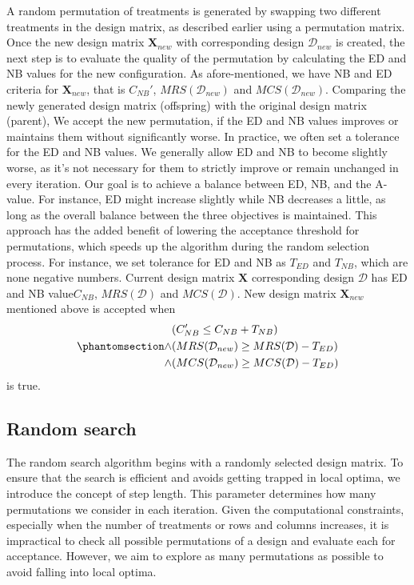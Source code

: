 \documentclass[
  a4paper,
  oneside,
  openany,
  12pt,
  onecolumn]{book}
\theoremstyle{plain}
\theoremstyle{definition}
\theoremstyle{remark}
\begin{document}
A random permutation of treatments is generated by swapping two
different treatments in the design matrix, as described earlier using a
permutation matrix. Once the new design matrix \(\boldsymbol{X}_{new}\)
with corresponding design \(\mathcal{D}_{new}\) is created, the next
step is to evaluate the quality of the permutation by calculating the ED
and NB values for the new configuration. As afore-mentioned, we have NB
and ED criteria for \(\boldsymbol{X}_{new}\), that is \(C_{NB}'\),
\(MRS(\mathcal{D}_{new})\) and \(MCS(\mathcal{D}_{new})\). Comparing the
newly generated design matrix (offspring) with the original design
matrix (parent), We accept the new permutation, if the ED and NB values
improves or maintains them without significantly worse. In practice, we
often set a tolerance for the ED and NB values. We generally allow ED
and NB to become slightly worse, as it's not necessary for them to
strictly improve or remain unchanged in every iteration. Our goal is to
achieve a balance between ED, NB, and the A-value. For instance, ED
might increase slightly while NB decreases a little, as long as the
overall balance between the three objectives is maintained. This
approach has the added benefit of lowering the acceptance threshold for
permutations, which speeds up the algorithm during the random selection
process. For instance, we set tolerance for ED and NB as \(T_{ED}\) and
\(T_{NB}\), which are none negative numbers. Current design matrix
\(\boldsymbol{X}\) corresponding design \(\mathcal{D}\) has ED and NB
value\(C_{NB}\), \(MRS(\mathcal{D})\) and \(MCS(\mathcal{D})\). New
design matrix \(\boldsymbol{X}_{new}\) mentioned above is accepted when
\begin{equation}\phantomsection\label{eq-accp}{\begin{aligned}
&(C_{NB}'\leq C_{NB}+T_{NB}) \\
\land & (MRS(\mathcal{D}_{new})\geq MRS(\mathcal{D})-T_{ED})\\
\land & (MCS(\mathcal{D}_{new})\geq MCS(\mathcal{D})-T_{ED})
\end{aligned}}\end{equation} is true.

\subsection{Random search}\label{random-search}

The random search algorithm begins with a randomly selected design
matrix. To ensure that the search is efficient and avoids getting
trapped in local optima, we introduce the concept of step length. This
parameter determines how many permutations we consider in each
iteration. Given the computational constraints, especially when the
number of treatments or rows and columns increases, it is impractical to
check all possible permutations of a design and evaluate each for
acceptance. However, we aim to explore as many permutations as possible
to avoid falling into local optima.
\end{document}
